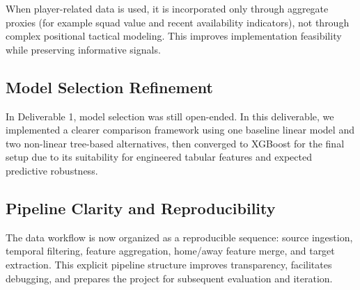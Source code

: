 \documentclass{article}
\begin{document}
When player-related data is used, it is incorporated only through aggregate proxies (for example squad value and recent availability indicators), not through complex positional tactical modeling. This improves implementation feasibility while preserving informative signals.

\subsection{Model Selection Refinement}

In Deliverable 1, model selection was still open-ended. In this deliverable, we implemented a clearer comparison framework using one baseline linear model and two non-linear tree-based alternatives, then converged to XGBoost for the final setup due to its suitability for engineered tabular features and expected predictive robustness.

\subsection{Pipeline Clarity and Reproducibility}

The data workflow is now organized as a reproducible sequence: source ingestion, temporal filtering, feature aggregation, home/away feature merge, and target extraction. This explicit pipeline structure improves transparency, facilitates debugging, and prepares the project for subsequent evaluation and iteration.
\end{document}
